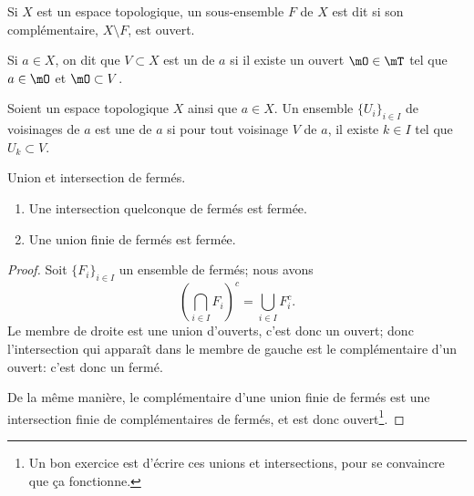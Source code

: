 \begin{definition}	\label{DEFFermeooNSAAooHxZbAo}
	Si \(X \) est un espace topologique, un sous-ensemble \( F \) de \( X \) est dit  si son complémentaire, \( X\setminus F \), est ouvert.
\end{definition}

\begin{definition}		\label{DEFVoisinageooGHZCooLRcpXY}
	Si \(a \in X\), on dit que \(V \subset X\) est un  de \(a\) si il existe un ouvert \(\mO \in \mT\) tel que \(a \in \mO\) et \(\mO \subset V\).
\end{definition}

\begin{definition}       \label{DEFooBWZIooXotZLA}
	Soient un espace topologique \( X\) ainsi que \( a\in X\). Un ensemble \( \{ U_i \}_{i\in I}\) de voisinages de \( a\) est une  de \( a\) si pour tout voisinage \( V\) de \( a\), il existe \( k\in I\) tel que \( U_k\subset V\).
\end{definition}

\begin{lemma}   \label{LemQYUJwPC}
	Union et intersection de fermés.
	\begin{enumerate}
		\item       \label{ITEMooBHIGooMvkUtX}
		      Une intersection quelconque de fermés est fermée.
		\item       \label{ItemKJYVooMBmMbG}
		      Une union finie de fermés est fermée.
	\end{enumerate}
\end{lemma}

\begin{proof}
	Soit \( \{ F_i \}_{i\in I} \) un ensemble de fermés; nous avons
	\begin{equation}
		\left( \bigcap_{i\in I}F_i \right)^c=\bigcup_{i\in I}F_i^c.
	\end{equation}
	Le membre de droite est une union d'ouverts, c'est donc un ouvert; donc l'intersection qui apparaît dans le membre de gauche est le complémentaire d'un ouvert: c'est donc un fermé.

	De la même manière, le complémentaire d'une union finie de fermés est une intersection finie de complémentaires de fermés, et est donc ouvert\footnote{Un bon exercice est d'écrire ces unions et intersections, pour se convaincre que ça fonctionne.}.
\end{proof}

